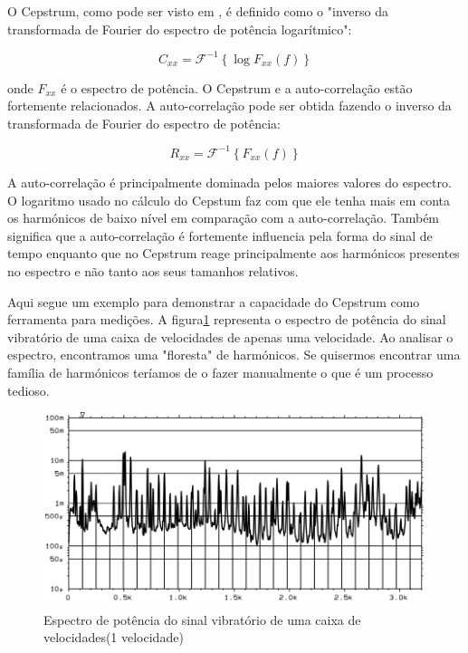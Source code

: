 O Cepstrum, como pode ser visto em \textcite{Notes}, é definido como o "inverso da transformada de Fourier do espectro de potência logarítmico": 

\begin{equation}
	C_{xx} = \mathcal{F}^{-1} \left \{ \log F_{xx}\left ( f \right ) \right \}
\end{equation}

	
	onde $F_{xx}$ é o espectro de potência. O Cepstrum e a auto-correlação estão fortemente relacionados. A auto-correlação pode ser obtida fazendo o inverso da transformada de Fourier do espectro de potência: 
	
\begin{equation}
	R_{xx} = \mathcal{F}^{-1} \left \{ F_{xx}\left ( f \right ) \right \}
\end{equation}


A auto-correlação é principalmente dominada pelos maiores valores do espectro. O logaritmo usado no cálculo do Cepstum faz com que ele tenha mais em conta os harmónicos de baixo nível em comparação com a auto-correlação. Também significa que a auto-correlação é fortemente influencia pela forma do sinal de tempo enquanto que no Cepstrum reage principalmente aos harmónicos presentes no espectro e não tanto aos seus tamanhos relativos.

Aqui segue um exemplo para demonstrar a capacidade do Cepstrum como ferramenta para medições. A figura\ref{spectrum Cepstrum1} representa o espectro de potência do sinal vibratório de uma caixa de velocidades de apenas uma velocidade. Ao analisar o espectro, encontramos uma "floresta" de harmónicos. Se quisermos encontrar uma família de harmónicos teríamos de o fazer manualmente o que é um processo tedioso.
	

\begin{figure}[H]
\centering
\includegraphics[scale=0.3]{figs/spectrum_cepstrum1}
\caption{Espectro de potência do sinal vibratório de uma caixa de velocidades(1 velocidade)}\label{spectrum Cepstrum1}
\end{figure}


